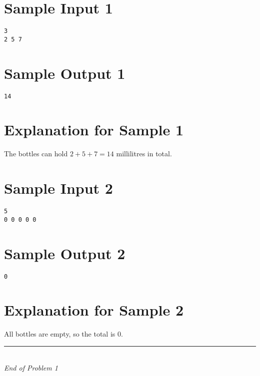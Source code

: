 \documentclass[12pt,a4paper]{article}
\begin{document}
\section*{Sample Input 1}
\begin{verbatim}
3
2 5 7
\end{verbatim}

\section*{Sample Output 1}
\begin{verbatim}
14
\end{verbatim}

\section*{Explanation for Sample 1}
The bottles can hold $2 + 5 + 7 = 14$ millilitres in total.

\section*{Sample Input 2}
\begin{verbatim}
5
0 0 0 0 0
\end{verbatim}

\section*{Sample Output 2}
\begin{verbatim}
0
\end{verbatim}

\section*{Explanation for Sample 2}
All bottles are empty, so the total is $0$.

\vfill
\begin{center}
    \rule{0.8\textwidth}{0.4pt} \\[0.5em]
    \textit{End of Problem 1}
\end{center}
\end{document}
